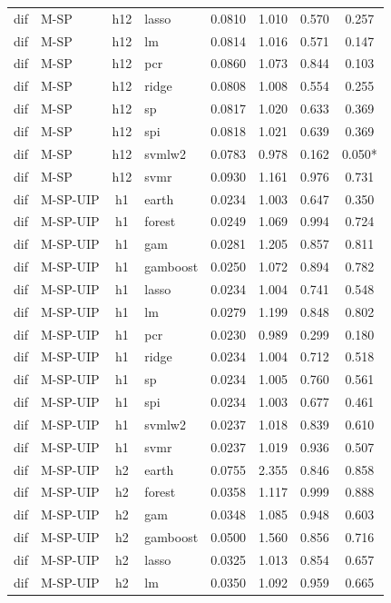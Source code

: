 \begin{ThreePartTable}
\begin{longtable}[t]{llclcccc}
dif & M-SP & h12 & lasso & 0.0810 & 1.010 & 0.570 & 0.257\\
dif & M-SP & h12 & lm & 0.0814 & 1.016 & 0.571 & 0.147\\
dif & M-SP & h12 & pcr & 0.0860 & 1.073 & 0.844 & 0.103\\
dif & M-SP & h12 & ridge & 0.0808 & 1.008 & 0.554 & 0.255\\
dif & M-SP & h12 & sp & 0.0817 & 1.020 & 0.633 & 0.369\\
dif & M-SP & h12 & spi & 0.0818 & 1.021 & 0.639 & 0.369\\
dif & M-SP & h12 & svmlw2 & 0.0783 & 0.978 & 0.162 & 0.050*\\
dif & M-SP & h12 & svmr & 0.0930 & 1.161 & 0.976 & 0.731\\
\addlinespace
dif & M-SP-UIP & h1 & earth & 0.0234 & 1.003 & 0.647 & 0.350\\
dif & M-SP-UIP & h1 & forest & 0.0249 & 1.069 & 0.994 & 0.724\\
dif & M-SP-UIP & h1 & gam & 0.0281 & 1.205 & 0.857 & 0.811\\
dif & M-SP-UIP & h1 & gamboost & 0.0250 & 1.072 & 0.894 & 0.782\\
dif & M-SP-UIP & h1 & lasso & 0.0234 & 1.004 & 0.741 & 0.548\\
dif & M-SP-UIP & h1 & lm & 0.0279 & 1.199 & 0.848 & 0.802\\
dif & M-SP-UIP & h1 & pcr & 0.0230 & 0.989 & 0.299 & 0.180\\
dif & M-SP-UIP & h1 & ridge & 0.0234 & 1.004 & 0.712 & 0.518\\
dif & M-SP-UIP & h1 & sp & 0.0234 & 1.005 & 0.760 & 0.561\\
dif & M-SP-UIP & h1 & spi & 0.0234 & 1.003 & 0.677 & 0.461\\
dif & M-SP-UIP & h1 & svmlw2 & 0.0237 & 1.018 & 0.839 & 0.610\\
dif & M-SP-UIP & h1 & svmr & 0.0237 & 1.019 & 0.936 & 0.507\\
\addlinespace
dif & M-SP-UIP & h2 & earth & 0.0755 & 2.355 & 0.846 & 0.858\\
dif & M-SP-UIP & h2 & forest & 0.0358 & 1.117 & 0.999 & 0.888\\
dif & M-SP-UIP & h2 & gam & 0.0348 & 1.085 & 0.948 & 0.603\\
dif & M-SP-UIP & h2 & gamboost & 0.0500 & 1.560 & 0.856 & 0.716\\
dif & M-SP-UIP & h2 & lasso & 0.0325 & 1.013 & 0.854 & 0.657\\
dif & M-SP-UIP & h2 & lm & 0.0350 & 1.092 & 0.959 & 0.665\\

\end{longtable}
\end{ThreePartTable}
